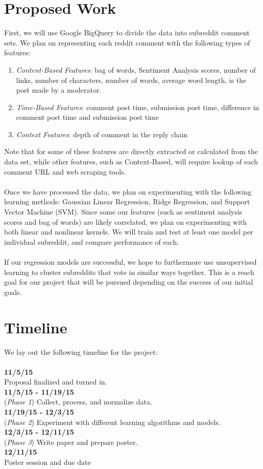 \documentclass[11pt, twocolumn]{article}
\begin{document}
\section{Proposed Work}
First, we will use Google BigQuery to divide the data into subreddit comment sets. We plan on representing each reddit comment with the following types of features:

\begin{enumerate}
	\item \textit{Content-Based Features}: bag of words, Sentiment Analysis \cite{sentiment} scores, number of links, number of characters, number of words, average word length, is the post made by a moderator.
	\item \textit{Time-Based Features}: comment post time, submission post time, difference in comment post time and submission post time
	\item \textit{Context Features}: depth of comment in the reply chain  
\end{enumerate}
Note that for some of these features are directly extracted or calculated from the data set, while other features, such as Context-Based, will require lookup of each comment URL and web scraping tools. 
\\ \\
Once we have processed the data, we plan on experimenting with the following learning methods: Gaussian Linear Regression, Ridge Regression, and Support Vector Machine (SVM). Since some our features (such as sentiment analysis scores and bag of words) are likely correlated, we plan on experimenting with both linear and nonlinear kernels. We will train and test at least one model per individual subreddit, and compare performance of each.
\\ \\
If our regression models are successful, we hope to furthermore use unsupervised learning to cluster subreddits that vote in similar ways together. This is a reach goal for our project that will be pursued depending on the success of our initial goals.

\section{Timeline}
We lay out the following timeline for the project: 
\\ \\
\textbf{11/5/15} \\ Proposal finalized and turned in. \\
\textbf{11/5/15 - 11/19/15} \\ (\textit{Phase 1}) Collect, process, and normalize data. \\
\textbf{11/19/15 - 12/3/15} \\ (\textit{Phase 2}) Experiment with different learning algorithms and models. \\
\textbf{12/3/15 - 12/11/15} \\ (\textit{Phase 3}) Write paper and prepare poster. \\
\textbf{12/11/15} \\ Poster session and due date \\
\end{document}
